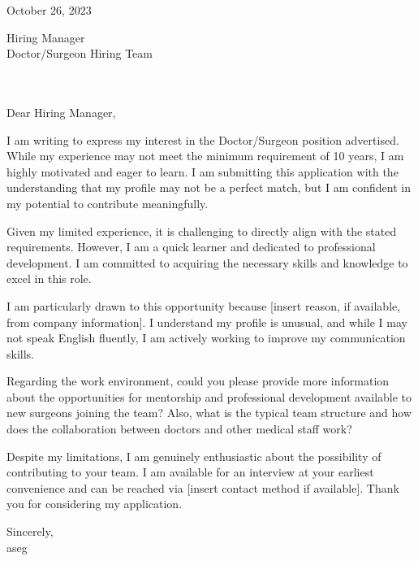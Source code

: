\documentclass[letterpaper,11pt]{article}
\begin{document}
October 26, 2023 \\
\vspace{20pt}

Hiring Manager \\ %
Doctor/Surgeon Hiring Team \\
[Hospital/Clinic Name] \\ %
[Address if known] \\
\vspace{20pt}

Dear Hiring Manager, \\
\vspace{10pt}

I am writing to express my interest in the Doctor/Surgeon position advertised. While my experience may not meet the minimum requirement of 10 years, I am highly motivated and eager to learn. I am submitting this application with the understanding that my profile may not be a perfect match, but I am confident in my potential to contribute meaningfully.
\vspace{10pt}

Given my limited experience, it is challenging to directly align with the stated requirements. However, I am a quick learner and dedicated to professional development. I am committed to acquiring the necessary skills and knowledge to excel in this role.
\vspace{10pt}

I am particularly drawn to this opportunity because [insert reason, if available, from company information]. I understand my profile is unusual, and while I may not speak English fluently, I am actively working to improve my communication skills.

Regarding the work environment, could you please provide more information about the opportunities for mentorship and professional development available to new surgeons joining the team? Also, what is the typical team structure and how does the collaboration between doctors and other medical staff work?
\vspace{10pt}

Despite my limitations, I am genuinely enthusiastic about the possibility of contributing to your team. I am available for an interview at your earliest convenience and can be reached via [insert contact method if available]. Thank you for considering my application.
\vspace{20pt}

Sincerely, \\
\vspace{40pt} %
aseg

\end{document}
